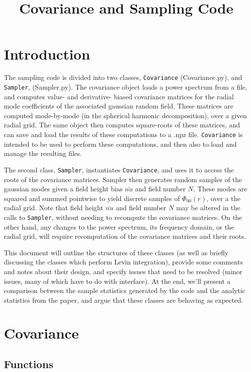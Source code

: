 \documentclass[10pt,a4paper]{article}
\title{Covariance and Sampling Code}
\begin{document}
\maketitle
\section{Introduction}

The sampling code is divided into two classes, \verb|Covariance| (Covariance.py), and \verb|Sampler|, (Sampler.py). The covariance object loads a power spectrum from a file, and computes value- and derivative- biased covariance matrices for the radial mode coefficients of the associated gaussian random field. These matrices are computed mode-by-mode (in the spherical harmonic decomposition), over a given radial grid. The same object then computes square-roots of these matrices, and can save and load the results of these computations to a .npz file. \verb|Covariance| is intended to be used to perform these computations, and then also to load and manage the resulting files. 

The second class, \verb|Sampler|, instantiates \verb|Covariance|, and uses it to access the roots of the covariance matrices. Sampler then generates random samples of the gaussian modes given a field height bias $\bar{nu}$ and field number $N$. These modes are squared and summed pointwise to yield discrete samples of $\Phi_{00}(r)$, over a the radial grid. Note that field height $\bar{nu}$ and field number $N$ may be altered in the calls to \verb|Sampler|, without needing to recompute the covariance matrices. On the other hand, any changes to the power spectrum, its frequency domain, or the radial grid, will require recomputation of the covariance matrices and their roots.

This document will outline the structures of these classes (as well as briefly discussing the classes which perform Levin integration), provide some comments and notes about their design, and specify issues that need to be resolved (minor issues, many of which have to do with interface). At the end, we'll present a comparison between the sample statistics generated by the code and the analytic statistics from the paper, and argue that these classes are behaving as expected.

\section{Covariance}
\subsection{Functions}
\end{document}
